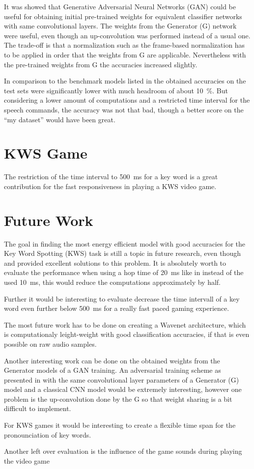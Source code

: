 It was showed that Generative Adversarial Neural Networks (GAN) could be useful for obtaining initial pre-trained weights for equivalent classifier networks with same convolutional layers.
The weights from the Generator (G) network were useful, even though an up-convolution was performed instead of a usual one.
The trade-off is that a normalization such as the frame-based normalization has to be applied in order that the weights from G are applicable.
Nevertheless with the pre-trained weights from G the accuracies increased slightly.

In comparison to the benchmark models listed in  the obtained accuracies on the test sets were significantly lower with much headroom of about \SI{10}{\percent}.
But considering a lower amount of computations and a restricted time interval for the speech commands, the accuracy was not that bad, though a better score on the \enquote{my dataset} would have been great.



\section{KWS Game}
\thesisStateNotReady
The restriction of the time interval to \SI{500}{\milli\second} for a key word is a great contribution for the fast responsiveness in playing a KWS video game. 



\section{Future Work}
\thesisStateNotReady
The goal in finding the most energy efficient model with good accuracies for the Key Word Spotting (KWS) task is still a topic in future research, even though \cite{Zhang2017} and \cite{Peter2020} provided excellent solutions to this problem.
It is absolutely worth to evaluate the performance when using a hop time of \SI{20}{\milli\second} like in \cite{Peter2020} instead of the used \SI{10}{\milli\second}, this would reduce the computations approximately by half.

Further it would be interesting to evaluate decrease the time intervall of a key word even further below \SI{500}{\milli\second} for a really fast paced gaming experience.

The most future work has to be done on creating a Wavenet architecture, which is computationaly leight-weight with good classification accuracies, if that is even possible on raw audio samples.

Another interesting work can be done on the obtained weights from the Generator models of a GAN training. 
An adversarial training scheme as presented in \cite{Oezdenizci2020} with the same convolutional layer parameters of a Generator (G) model and a classical CNN model would be extremely interesting, however one problem is the up-convolution done by the G so that weight sharing is a bit difficult to implement.

For KWS games it would be interesting to create a flexible time span for the pronounciation of key words.

Another left over evaluation is the influence of the game sounds during playing the video game